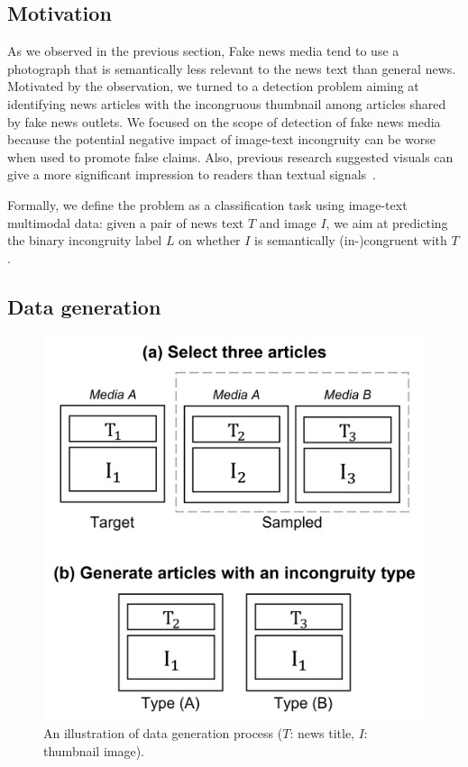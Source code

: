 \documentclass[11pt]{article}
\begin{document}
\subsection{Motivation}
As we observed in the previous section, Fake news media tend to use a photograph that is semantically less relevant to the news text than general news. Motivated by the observation, we turned to a detection problem aiming at identifying news articles with the incongruous thumbnail among articles shared by fake news outlets. We focused on the scope of detection of fake news media because the potential negative impact of image-text incongruity can be worse when used to promote false claims. Also, previous research suggested visuals can give a more significant impression to readers than textual signals~\cite{seo2020meta}.

Formally, we define the problem as a classification task using image-text multimodal data: given a pair of news text $T$ and image $I$, we aim at predicting the binary incongruity label $L$ on whether $I$ is semantically (in-)congruent with $T$.

\subsection{Data generation}

\begin{figure}[ht]
    \centering
    \includegraphics[width=\linewidth]{fig/data_gen4.png}
    \caption{An illustration of data generation process ($T$: news title, $I$: thumbnail image).}
    \label{fig:datagen1}
\end{figure}
\end{document}
